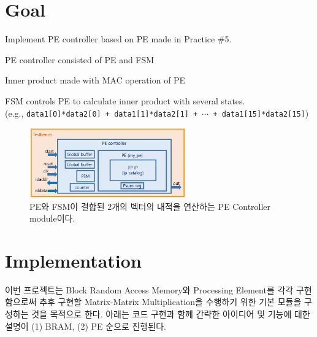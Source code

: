 \documentclass{article}
\newcommand{\orange}[1]{{\color{orange} #1}}
\begin{document}
\pagestyle{fancy}

\section*{Goal}

\begin{itemize*}
\item Implement PE controller based on PE made in Practice \#5.
\begin{itemize*}
\item PE controller consisted of PE and FSM
\item Inner product made with MAC operation of PE
\end{itemize*}
\item FSM controls PE to calculate inner product with several states. \\
(e.g., \texttt{data1[0]*data2[0] + data1[1]*data2[1] + $\cdots$ + data1[15]*data2[15]})
\end{itemize*}
\begin{figure}[ht]
	\centering
	\includegraphics[width=0.6\textwidth]{fig/fig1.png}
\caption{PE와 FSM이 결합된 2개의 벡터의 내적을 연산하는 PE Controller module이다.}
\label{fig1}
\end{figure}

\section{Implementation}
\orange{
이번 프로젝트는 Block Random Access Memory와 Processing Element를 각각 구현함으로써 추후 구현할 Matrix-Matrix Multiplication을 수행하기 위한 기본 모듈을 구성하는 것을 목적으로 한다. 아래는 코드 구현과 함께 간략한 아이디어 및 기능에 대한 설명이 (1) BRAM, (2) PE 순으로 진행된다.
}
\end{document}
